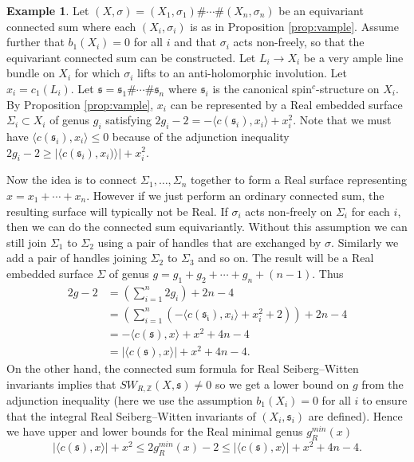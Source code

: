 \documentclass{amsart}
\theoremstyle{definition}
\newtheorem{example}[theorem]{Example}
\theoremstyle{remark}
\numberwithin{equation}{section}
\begin{document}
\begin{example}
Let $(X , \sigma) = (X_1 , \sigma_1) \# \cdots \# (X_n , \sigma_n)$ be an equivariant connected sum where each $(X_i , \sigma_i)$ is as in Proposition \ref{prop:vample}. Assume further that $b_1(X_i) = 0$ for all $i$ and that $\sigma_i$ acts non-freely, so that the equivariant connected sum can be constructed. Let $L_i \to X_i$ be a very ample line bundle on $X_i$ for which $\sigma_i$ lifts to an anti-holomorphic involution. Let $x_i = c_1(L_i)$. Let $\mathfrak{s} = \mathfrak{s}_1 \# \cdots \# \mathfrak{s}_n$ where $\mathfrak{s}_i$ is the canonical spin$^c$-structure on $X_i$. By Proposition \ref{prop:vample}, $x_i$ can be represented by a Real embedded surface $\Sigma_i \subset X_i$ of genus $g_i$ satisfying $2g_i - 2 = -\langle c(\mathfrak{s}_i) , x_i \rangle + x_i^2$. Note that we must have $\langle c(\mathfrak{s}_i) , x_i \rangle \le 0$ because of the adjunction inequality $2g_i - 2 \ge | \langle c(\mathfrak{s}_i) , x_i) \rangle | + x_i^2$.

Now the idea is to connect $\Sigma_1, \dots , \Sigma_n$ together to form a Real surface representing $x = x_1 + \cdots + x_n$. However if we just perform an ordinary connected sum, the resulting surface will typically not be Real. If $\sigma_i$ acts non-freely on $\Sigma_i$ for each $i$, then we can do the connected sum equivariantly. Without this assumption we can still join $\Sigma_1$ to $\Sigma_2$ using a pair of handles that are exchanged by $\sigma$. Similarly we add a pair of handles joining $\Sigma_2$ to $\Sigma_3$ and so on. The result will be a Real embedded surface $\Sigma$ of genus $g = g_1 + g_2 + \cdots + g_n + (n-1)$. Thus
\begin{align*}
2g-2 &= \left( \sum_{i=1}^n 2g_i \right) + 2n-4 \\
&= \left( \sum_{i=1}^{n} (-\langle c(\mathfrak{s_i}) , x_i \rangle + x_i^2 + 2)\right) + 2n-4 \\
&= -\langle c(\mathfrak{s}) , x \rangle + x^2 + 4n-4 \\
&= | \langle c(\mathfrak{s}) , x \rangle | + x^2 + 4n-4.
\end{align*}
On the other hand, the connected sum formula for Real Seiberg--Witten invariants implies that $SW_{R,\mathbb{Z}}(X,\mathfrak{s}) \neq 0$ so we get a lower bound on $g$ from the adjunction inequality (here we use the assumption $b_1(X_i) = 0$ for all $i$ to ensure that the integral Real Seiberg--Witten invariants of $(X_i , \mathfrak{s}_i)$ are defined). Hence we have upper and lower bounds for the Real minimal genus $g^{min}_R(x)$
\[
|\langle c(\mathfrak{s}) , x \rangle| + x^2 \le 2g^{min}_R(x) - 2 \le |\langle c(\mathfrak{s}) , x \rangle | + x^2 + 4n-4.
\]
\end{example}
\end{document}
